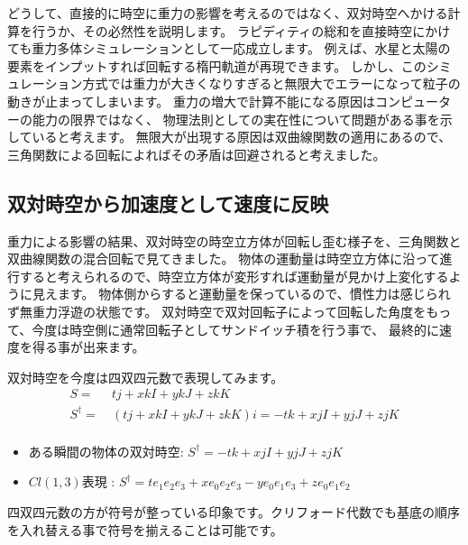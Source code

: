 \documentclass[a4paper,12pt,notitlepage]{jsreport}
\begin{document}
どうして、直接的に時空に重力の影響を考えるのではなく、双対時空へかける計算を行うか、その必然性を説明します。
ラピディティの総和を直接時空にかけても重力多体シミュレーションとして一応成立します。
例えば、水星と太陽の要素をインプットすれば回転する楕円軌道が再現できます。
しかし、このシミュレーション方式では重力が大きくなりすぎると無限大でエラーになって粒子の動きが止まってしまいます。
重力の増大で計算不能になる原因はコンピューターの能力の限界ではなく、
物理法則としての実在性について問題がある事を示していると考えます。
無限大が出現する原因は双曲線関数の適用にあるので、三角関数による回転によればその矛盾は回避されると考えました。

\subsection{双対時空から加速度として速度に反映}

重力による影響の結果、双対時空の時空立方体が回転し歪む様子を、三角関数と双曲線関数の混合回転で見てきました。
物体の運動量は時空立方体に沿って進行すると考えられるので、時空立方体が変形すれば運動量が見かけ上変化するように見えます。
物体側からすると運動量を保っているので、慣性力は感じられず無重力浮遊の状態です。
双対時空で双対回転子によって回転した角度をもって、今度は時空側に通常回転子としてサンドイッチ積を行う事で、
最終的に速度を得る事が出来ます。

双対時空を今度は四双四元数で表現してみます。
\begin{equation}
  \begin{split}
    S = ~ & t j + x kI + y kJ + z kK \\
    S^\dag = ~ & (t j + x kI + y kJ + z kK)i = - t k + x jI + y jJ + z jK \\
  \end{split}
\end{equation}
\begin{itemize}
  \item ある瞬間の物体の双対時空: $ S^\dag = - t k + x jI + y jJ + z jK $
  \item $ Cl(1,3) $表現 : $ S^\dag = t e_1e_2e_3 + x e_0e_2e_3 - y e_0e_1e_3 + z e_0e_1e_2 $
\end{itemize}
四双四元数の方が符号が整っている印象です。クリフォード代数でも基底の順序を入れ替える事で符号を揃えることは可能です。
\end{document}
